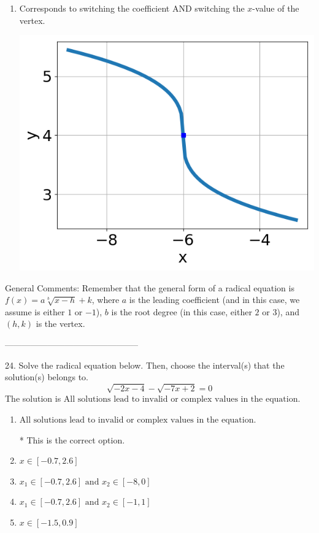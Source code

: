 \documentclass{article}[10pt]
\begin{document}
\begin{enumerate}[label=\Alph*.]
\item Corresponds to switching the coefficient AND switching the $x$-value of the vertex. 
\begin{center}\includegraphics[scale=0.5]{../Figures/question23MUD.png}\end{center} 
 
\end{enumerate} 
 
General Comments: Remember that the general form of a radical equation is $ f(x) = a \sqrt[b]{x - h} + k$, where $a$ is the leading coefficient (and in this case, we assume is either $1$ or $-1$), $b$ is the root degree (in this case, either $2$ or $3$), and $(h, k)$ is the vertex.

-----------------------------------------------

24. Solve the radical equation below. Then, choose the interval(s) that the solution(s) belongs to.
$$ \sqrt{-2 x - 4} - \sqrt{-7 x + 2} = 0 $$ 
The solution is $ \text{All solutions lead to invalid or complex values in the equation.} $ 

\begin{enumerate}[label=\Alph*.] 
\item $ \text{All solutions lead to invalid or complex values in the equation.} $ 

 * This is the correct option. 
\item $ x \in [-0.7,2.6] $ 

  
\item $ x_1 \in [-0.7, 2.6] \text{ and } x_2 \in [-8,0] $ 

  
\item $ x_1 \in [-0.7, 2.6] \text{ and } x_2 \in [-1,1] $ 

  
\item $ x \in [-1.5,0.9] $ 

  
\end{enumerate} 
 
\end{document}
